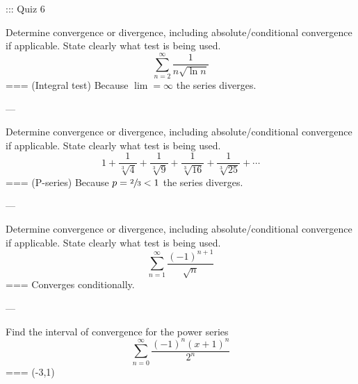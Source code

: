 ::: Quiz 6

Determine convergence or divergence, including absolute/conditional convergence
if applicable. State clearly what test is being used.
\[\sum_{n=2}^\infty \frac{1}{n\sqrt{\ln n}}\]
===
(Integral test) Because \(\lim=\infty\) the series diverges.

---

Determine convergence or divergence, including absolute/conditional convergence
if applicable. State clearly what test is being used.
\[1+\frac{1}{\sqrt[3]{4}}+\frac{1}{\sqrt[3]{9}}+\frac{1}{\sqrt[3]{16}}+\frac{1}{\sqrt[3]{25}}+\cdots\]
===
(P-series) Because \(p=\sfrac{2}{3}<1\) the series diverges.

---

Determine convergence or divergence, including absolute/conditional convergence
if applicable. State clearly what test is being used.
\[\sum_{n=1}^\infty \frac{{(-1)}^{n+1}}{\sqrt{n}}\]
===
Converges conditionally.

---

Find the interval of convergence for the power series
\[\sum_{n=0}^\infty \frac{{(-1)}^n{(x+1)}^n}{2^n}\]
===
(-3,1)


